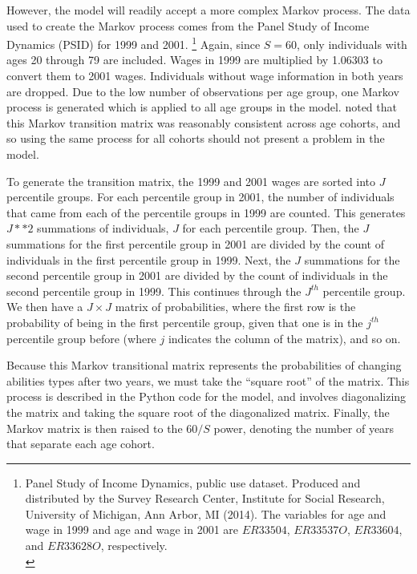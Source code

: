 However, the model will readily accept a more complex Markov process.  The data used to create the Markov process comes from the Panel Study of Income Dynamics (PSID) for 1999 and 2001. \footnote{Panel Study of Income Dynamics, public use dataset. Produced and distributed by the Survey Research Center, Institute for Social Research, University of Michigan, Ann Arbor, MI (2014). The variables for age and wage in 1999 and age and wage in 2001 are $ER33504$, $ER33537O$, $ER33604$, and $ER33628O$, respectively.\\ [-2pt]} Again, since $S=60$, only individuals with ages 20 through 79 are included.  Wages in 1999 are multiplied by 1.06303 to convert them to 2001 wages. Individuals without wage information in both years are dropped. Due to the low number of observations per age group, one Markov process is generated which is applied to all age groups in the model. \cite{Nishiyama:2003} noted that this Markov transition matrix was reasonably consistent across age cohorts, and so using the same process for all cohorts should not present a problem in the model.

To generate the transition matrix, the 1999 and 2001 wages are sorted into $J$ percentile groups.  For each percentile group in 2001, the number of individuals that came from each of the percentile groups in 1999 are counted.  This generates $J ** 2$ summations of individuals, $J$ for each percentile group.  Then, the $J$ summations for the first percentile group in 2001 are divided by the count of individuals in the first percentile group in 1999.  Next, the $J$ summations for the second percentile group in 2001 are divided by the count of individuals in the second percentile group in 1999.  This continues through the $J^{th}$ percentile group.  We then have a $J \times J$ matrix of probabilities, where the first row is the probability of being in the first percentile group, given that one is in the $j^{th}$ percentile group before (where $j$ indicates the column of the matrix), and so on.

Because this Markov transitional matrix represents the probabilities of changing abilities types after two years, we must take the ``square root'' of the matrix.  This process is described in the Python code for the model, and involves diagonalizing the matrix and taking the square root of the diagonalized matrix.  Finally, the Markov matrix is then raised to the $60/S$ power, denoting the number of years that separate each age cohort.